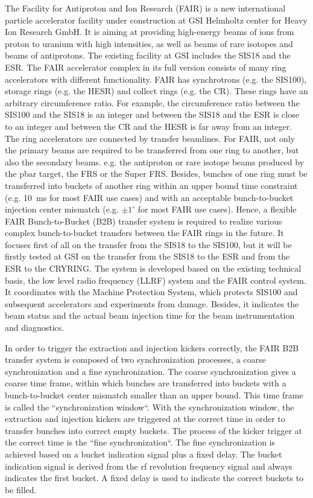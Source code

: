 The Facility for Antiproton and Ion Research (FAIR) is a new international particle accelerator facility under construction at GSI Helmholtz center for Heavy Ion Research GmbH. It is aiming at providing high-energy beams of ions from proton to uranium with high intensities, as well as beams of rare isotopes and beams of antiprotons. The existing facility at GSI includes the SIS18 and the ESR. The FAIR accelerator complex in its full version consists of many ring accelerators with different functionality. FAIR has synchrotrons (e.g. the SIS100), storage rings (e.g. the HESR) and collect rings (e.g. the CR). These rings have an arbitrary circumference ratio. For example, the circumference ratio between the SIS100 and the SIS18 is an integer and between the SIS18 and the ESR is close to an integer and between the CR and the HESR is far away from an integer. The ring accelerators are connected by transfer beamlines. For FAIR, not only the primary beams are required to be transferred from one ring to another, but also the secondary beams. e.g. the antiproton or rare isotope beams produced by the pbar target, the FRS or the Super FRS. Besides, bunches of one ring must be transferred into buckets of another ring within an upper bound time constraint (e.g. \SI{10}{\ms} for most FAIR use cases) and with an acceptable bunch-to-bucket injection center mismatch (e.g. $\pm1^\circ$ for most FAIR use cases). Hence, a flexible FAIR Bunch-to-Bucket (B2B) transfer system is required to realize various complex bunch-to-bucket transfers between the FAIR rings in the future. It focuses first of all on the transfer from the SIS18 to the SIS100, but it will be firstly tested at GSI on the transfer from the SIS18 to the ESR and from the ESR to the CRYRING. The system is developed based on the existing technical basis, the low level radio frequency (LLRF) system and the FAIR control system. It coordinates with the Machine Protection System, which protects SIS100 and subsequent accelerators and experiments from damage. Besides, it indicates the beam status and the actual beam injection time for the beam instrumentation and diagnostics. 

In order to trigger the extraction and injection kickers correctly, the FAIR B2B transfer system is composed of two synchronization processes, a coarse synchronization and a fine synchronization. The coarse synchronization gives a coarse time frame, within which bunches are transferred into buckets with a bunch-to-bucket center mismatch smaller than an upper bound. This time frame is called the ``synchronization window``. With the synchronization window, the extraction and injection kickers are triggered at the correct time in order to transfer bunches into correct empty buckets. The process of the kicker trigger at the correct time is the ``fine synchronization``. The fine synchronization is achieved based on a bucket indication signal plus a fixed delay. The bucket indication signal is derived from the rf revolution frequency signal and always indicates the first bucket. A fixed delay is used to indicate the correct buckets to be filled.

